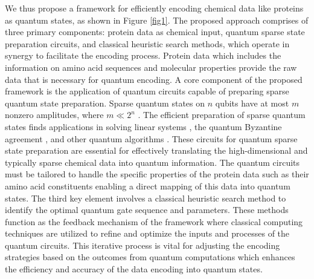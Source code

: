 We thus propose a framework for efficiently encoding chemical data like proteins as quantum states, as shown in Figure \ref{fig1}. The proposed approach comprises of three primary components: protein data as chemical input, quantum sparse state preparation circuits, and classical heuristic search methods, which operate in synergy to facilitate the encoding process. Protein data which includes the information on amino acid sequences and molecular properties provide the raw data that is necessary for quantum encoding. A core component of the proposed framework is the application of quantum circuits capable of preparing sparse quantum state preparation. Sparse quantum states on $n$ qubits have at most
$m$ nonzero amplitudes, where $m \ll 2^n$ \cite{PhysRevA.106.022617}. The efficient preparation of sparse 
quantum states finds applications in solving linear systems 
\cite{PhysRevLett.103.150502}, the quantum Byzantine agreement
\cite{10.1145/1060590.1060662}, and other quantum algorithms \cite{9272350, biamonte2017quantum}.  These circuits for quantum sparse state preparation are essential for effectively translating the high-dimensional and typically sparse chemical data into quantum information. The quantum circuits must be tailored to handle the specific properties of the protein data such as their amino acid constituents enabling a direct mapping of this data into quantum states. The third key element involves a classical heuristic search method to identify the optimal quantum gate sequence and parameters. These methods function as the feedback mechanism of the framework where classical computing techniques are utilized to refine and optimize the inputs and processes of the quantum circuits. This iterative process is vital for adjusting the encoding strategies based on the outcomes from quantum computations which enhances the efficiency and accuracy of the data encoding into quantum states.

